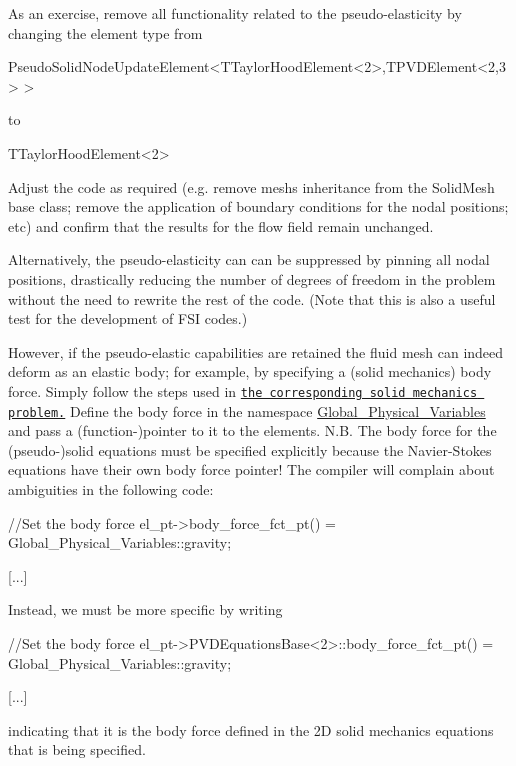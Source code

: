 \begin{DoxyItemize}
\item As an exercise, remove all functionality related to the pseudo-\/elasticity by changing the element type from 
\begin{DoxyCode}
PseudoSolidNodeUpdateElement<TTaylorHoodElement<2>,TPVDElement<2,3> >
\end{DoxyCode}
 to 
\begin{DoxyCode}
TTaylorHoodElement<2>
\end{DoxyCode}
 Adjust the code as required (e.\+g. remove mesh\textquotesingle{}s inheritance from the {\ttfamily Solid\+Mesh} base class; remove the application of boundary conditions for the nodal positions; etc) and confirm that the results for the flow field remain unchanged. ~\newline
~\newline

\item Alternatively, the pseudo-\/elasticity can can be suppressed by pinning all nodal positions, drastically reducing the number of degrees of freedom in the problem without the need to rewrite the rest of the code. (Note that this is also a useful test for the development of F\+SI codes.) ~\newline
~\newline

\item However, if the pseudo-\/elastic capabilities are retained the fluid mesh can indeed deform as an elastic body; for example, by specifying a (solid mechanics) body force. Simply follow the steps used in \href{../../../solid/unstructured_solid/html/index.html}{\tt the corresponding solid mechanics problem.} Define the body force in the namespace {\ttfamily \hyperlink{namespaceGlobal__Physical__Variables}{Global\+\_\+\+Physical\+\_\+\+Variables}} and pass a (function-\/)pointer to it to the elements. N.\+B. The body force for the (pseudo-\/)solid equations must be specified explicitly because the Navier-\/\+Stokes equations have their own body force pointer! The compiler will complain about ambiguities in the following code\+: ~\newline

\begin{DoxyCode}
[...]

 \textcolor{comment}{//Set the body force}
 el\_pt->body\_force\_fct\_pt() = Global\_Physical\_Variables::gravity;

[...]  
\end{DoxyCode}
 Instead, we must be more specific by writing ~\newline

\begin{DoxyCode}
[...]

 \textcolor{comment}{//Set the body force}
 el\_pt->PVDEquationsBase<2>::body\_force\_fct\_pt() = 
  Global\_Physical\_Variables::gravity;

[...]   
\end{DoxyCode}
 indicating that it is the body force defined in the 2D solid mechanics equations that is being specified.
\end{DoxyItemize}

